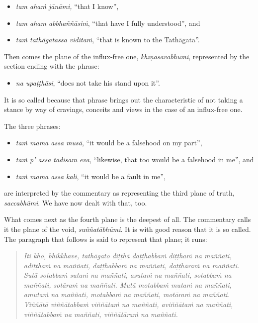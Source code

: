 \begin{itemize}
\tightlist
\item
  \emph{tam ahaṁ jānāmi,} ``that I know'',
\item
  \emph{tam aham abbhaññāsiṁ}, ``that have I fully understood'', and
\item
  \emph{taṁ tathāgatassa viditaṁ}, ``that is known to the Tathāgata''.
\end{itemize}

Then comes the plane of the influx-free one, \emph{khīṇāsavabhūmi}, represented by the section ending with the phrase:

\begin{itemize}
\tightlist
\item
  \emph{na upaṭṭhāsi}, ``does not take his stand upon it''.
\end{itemize}

It is so called because that phrase brings out the characteristic of not taking a stance by way of cravings, conceits and views in the case of an influx-free one.

The three phrases:

\begin{itemize}
\tightlist
\item
  \emph{taṁ mama assa musā}, ``it would be a falsehood on my part'',
\item
  \emph{taṁ p' assa tādisam eva}, ``likewise, that too would be a falsehood in me'', and
\item
  \emph{taṁ mama assa kali}, ``it would be a fault in me'',
\end{itemize}

are interpreted by the commentary as representing the third plane of truth, \emph{saccabhūmi}. We have now dealt with that, too.

What comes next as the fourth plane is the deepest of all. The commentary calls it the plane of the void, \emph{suññatābhūmi}. It is with good reason that it is so called. The paragraph that follows is said to represent that plane; it runs:

\begin{quote}
\emph{Iti kho, bhikkhave, tathāgato diṭṭhā daṭṭhabbaṁ diṭṭhaṁ na maññati, adiṭṭhaṁ na maññati, daṭṭhabbaṁ na maññati, daṭṭhāraṁ na maññati. Sutā sotabbaṁ sutaṁ na maññati, asutaṁ na maññati, sotabbaṁ na maññati, sotāraṁ na maññati. Mutā motabbaṁ mutaṁ na maññati, amutaṁ na maññati, motabbaṁ na maññati, motāraṁ na maññati. Viññātā viññātabbaṁ viññātaṁ na maññati, aviññātaṁ na maññati, viññātabbaṁ na maññati, viññātāraṁ na maññati.}
\end{quote}

